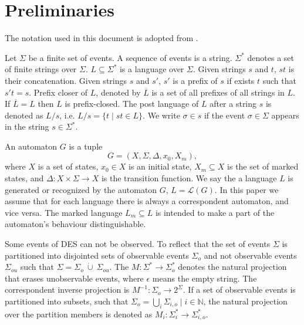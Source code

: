 \documentclass[a4paper, 10pt, conference]{ieeeconf} \IEEEoverridecommandlockouts
\begin{document}


\section{Preliminaries}
\label{sec:Preliminaries}
The notation used in this document is adopted from
\cite{cassandras_introduction_2010}.

Let $\Sigma$ be a finite set of events. A sequence of events is a string.
$\Sigma^*$ denotes a set of finite strings over $\Sigma$. $L\subseteq\Sigma^*$
is a language over $\Sigma$. Given strings $s$ and $t$, $st$ is their
concatenation. Given strings $s$ and $s'$, $s'$ is a prefix of $s$ if exists $t$
such that $s't = s$. Prefix closer of $L$, denoted by $\overline{L}$ is a set of
all prefixes of all strings in $L$.
If $\overline{L} = L$ then $L$ is prefix-closed. The post language of $L$ after
a string $s$ is denoted as $L/s$, i.e. $L/s = \{t\mid st \in L\}$. We write
$\sigma \in s$ if the event $\sigma \in \Sigma$ appears in the string $s \in
\Sigma^*$.

An automaton $G$ is a tuple $$G=(X,\Sigma,\Delta,x_0, X_m),$$ where $X$ is a
set of states, $x_0 \in X$ is an initial state, $X_m \subseteq X$ is the set of
marked states, and $\Delta: X \times \Sigma \rightarrow X$ is the transition
function.
We say the a language $L$ is generated or recognized by the automaton $G$, $L =
\mathcal{L}(G)$. In this paper we assume that for each language there is always
a correspondent automaton, and vice versa. The marked language $L_m \subseteq
L$ is intended to make a part of the automaton's behaviour distinguishable.

Some events of DES can not be observed. To reflect that the set of events
$\Sigma$ is partitioned into disjointed sets of observable events $\Sigma_o$ and
not observable events $\Sigma_{ou}$ such that $\Sigma = \Sigma_o~\dot{\cup}~
\Sigma_{ou}$.
The $M: \Sigma^* \rightarrow \Sigma_o^*$ denotes the natural projection that
erases unobservable events, where $\epsilon$ means the empty string. The
correspondent inverse projection is $M^{-1}: \Sigma_o \rightarrow 2^\Sigma$. If
a set of observable events is partitioned into subsets, such that $\Sigma_o =
\bigcup_i \Sigma_{i,o} \mid i \in \mathbb{N}$, the natural projection over the
partition members is denoted as $M_i: \Sigma_i^* \rightarrow \Sigma_{i,o}^*$.
\end{document}
